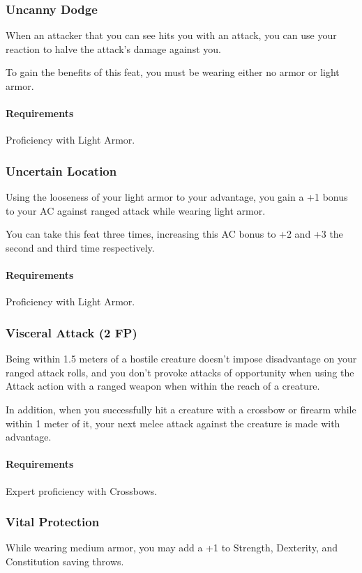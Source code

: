\subsubsection{Uncanny Dodge} \label{feat::uncannydodge}
    When an attacker that you can see hits you with an attack, you can use your reaction to halve the attack's damage against you.

    To gain the benefits of this feat, you must be wearing either no armor or light armor.
    \paragraph{Requirements} Proficiency with Light Armor.
\subsubsection{Uncertain Location} \label{feat::uncertainlocation}
    Using the looseness of your light armor to your advantage, you gain a +1 bonus to your AC against ranged attack while wearing light armor.

    You can take this feat three times, increasing this AC bonus to +2 and +3 the second and third time respectively.
    \paragraph{Requirements} Proficiency with Light Armor.
\subsubsection{Visceral Attack (2 FP)} \label{feat::visceralattack}
    Being within 1.5 meters of a hostile creature doesn't impose disadvantage on your ranged attack rolls, and you don't provoke attacks of opportunity when using the Attack action with a ranged weapon when within the reach of a creature.

    In addition, when you successfully hit a creature with a crossbow or firearm while within 1 meter of it, your next melee attack against the creature is made with advantage.
    \paragraph{Requirements} Expert proficiency with Crossbows.
\subsubsection{Vital Protection} \label{feat::vitalprotection}
    While wearing medium armor, you may add a +1 to Strength, Dexterity, and Constitution saving throws.

